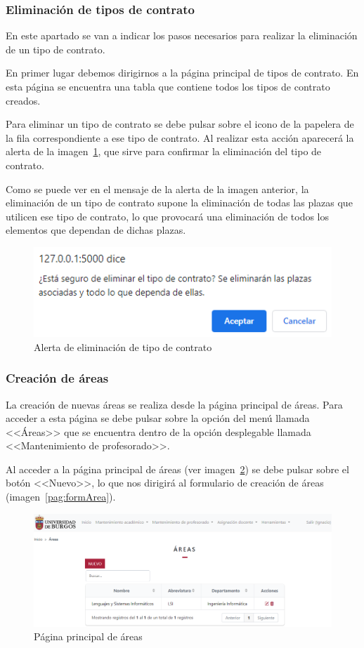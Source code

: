 \subsubsection{Eliminación de tipos de contrato}
En este apartado se van a indicar los pasos necesarios para realizar la eliminación de un tipo de contrato.

En primer lugar debemos dirigirnos a la página principal de tipos de contrato.
En esta página se encuentra una tabla que contiene todos los tipos de contrato creados.

Para eliminar un tipo de contrato se debe pulsar sobre el icono de la papelera de la fila correspondiente a ese tipo de contrato.
Al realizar esta acción aparecerá la alerta de la imagen~\ref{pag:alertElContrato}, que sirve para confirmar la eliminación del tipo de contrato.

Como se puede ver en el mensaje de la alerta de la imagen anterior, la eliminación de un tipo de contrato supone la eliminación de todas las plazas que utilicen ese tipo de contrato, lo que provocará una eliminación de todos los elementos que dependan de dichas plazas.

\begin{figure}
	\centering
	\includegraphics[width=.6\textwidth]{../img/Anexos/Manual usuario/alertElContrato.png}
	\caption{Alerta de eliminación de tipo de contrato}\label{pag:alertElContrato}
\end{figure}


\subsubsection{Creación de áreas}
La creación de nuevas áreas se realiza desde la página principal de áreas.
Para acceder a esta página se debe pulsar sobre la opción del menú llamada <<Áreas>> que se encuentra dentro de la opción desplegable llamada <<Mantenimiento de profesorado>>.

Al acceder a la página principal de áreas (ver imagen~\ref{pag:areas}) se debe pulsar sobre el botón <<Nuevo>>, lo que nos dirigirá al formulario de creación de áreas (imagen~\ref{pag:formArea}).

\begin{figure}
	\centering
	\includegraphics[width=\textwidth]{../img/Anexos/Manual usuario/areas.png}
	\caption{Página principal de áreas}\label{pag:areas}
\end{figure}

